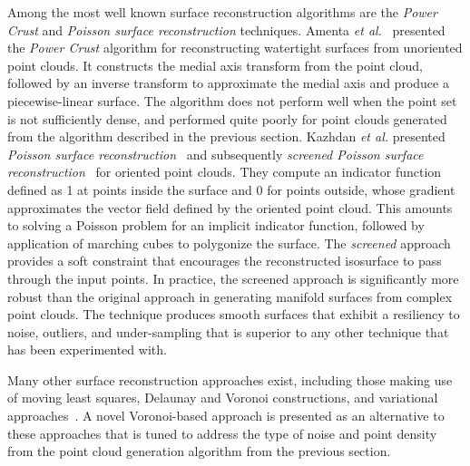 Among the most well known surface reconstruction algorithms are the \textit{Power Crust} and \textit{Poisson surface reconstruction} techniques. Amenta \textit{et al.}~\cite{amenta_2001} presented the \textit{Power Crust} algorithm for reconstructing watertight surfaces from unoriented point clouds. It constructs the medial axis transform from the point cloud, followed by an inverse transform to approximate the medial axis and produce a piecewise-linear surface. The algorithm does not perform well when the point set is not sufficiently dense, and performed quite poorly for point clouds generated from the algorithm described in the previous section. Kazhdan \textit{et al.} presented \textit{Poisson surface reconstruction}~\cite{kazhdan_2008} and subsequently \textit{screened Poisson surface reconstruction}~\cite{kazhdan_2013} for oriented point clouds. They compute an indicator function defined as 1 at points inside the surface and 0 for points outside, whose gradient approximates the vector field defined by the oriented point cloud. This amounts to solving a Poisson problem for an implicit indicator function, followed by application of marching cubes to polygonize the surface. The \textit{screened} approach provides a soft constraint that encourages the reconstructed isosurface to pass through the input points. In practice, the screened approach is significantly more robust than the original approach in generating manifold surfaces from complex point clouds. The technique produces smooth surfaces that exhibit a resiliency to noise, outliers, and under-sampling that is superior to any other technique that has been experimented with.

Many other surface reconstruction approaches exist, including those making use of moving least squares, Delaunay and Voronoi constructions, and variational approaches~\cite{berger}. A novel Voronoi-based approach is presented as an alternative to these approaches that is tuned to address the type of noise and point density from the point cloud generation algorithm from the previous section.

